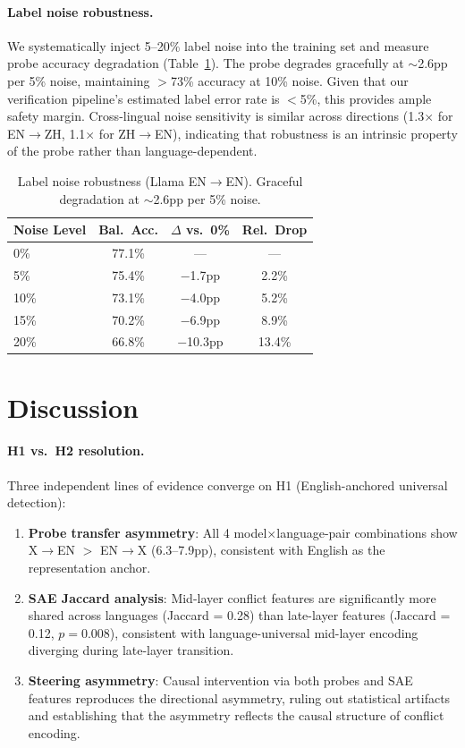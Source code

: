\documentclass{article}
\begin{document}
\paragraph{Label noise robustness.}
We systematically inject 5--20\% label noise into the training set and measure probe accuracy degradation (Table~\ref{tab:noise}). The probe degrades gracefully at $\sim$2.6pp per 5\% noise, maintaining $>$73\% accuracy at 10\% noise. Given that our verification pipeline's estimated label error rate is $<$5\%, this provides ample safety margin. Cross-lingual noise sensitivity is similar across directions (1.3$\times$ for EN$\to$ZH, 1.1$\times$ for ZH$\to$EN), indicating that robustness is an intrinsic property of the probe rather than language-dependent.

\begin{table}[t]
\centering
\caption{Label noise robustness (Llama EN$\to$EN). Graceful degradation at $\sim$2.6pp per 5\% noise.}
\label{tab:noise}
\small
\begin{tabular}{lccc}
\toprule
Noise Level & Bal.\ Acc. & $\Delta$ vs.\ 0\% & Rel.\ Drop \\
\midrule
0\% & 77.1\% & --- & --- \\
5\% & 75.4\% & $-$1.7pp & 2.2\% \\
10\% & 73.1\% & $-$4.0pp & 5.2\% \\
15\% & 70.2\% & $-$6.9pp & 8.9\% \\
20\% & 66.8\% & $-$10.3pp & 13.4\% \\
\bottomrule
\end{tabular}
\end{table}

\section{Discussion}

\paragraph{H1 vs.\ H2 resolution.}
Three independent lines of evidence converge on H1 (English-anchored universal detection):

\begin{enumerate}
    \item \textbf{Probe transfer asymmetry}: All 4 model$\times$language-pair combinations show X$\to$EN $>$ EN$\to$X (6.3--7.9pp), consistent with English as the representation anchor.
    \item \textbf{SAE Jaccard analysis}: Mid-layer conflict features are significantly more shared across languages (Jaccard = 0.28) than late-layer features (Jaccard = 0.12, $p = 0.008$), consistent with language-universal mid-layer encoding diverging during late-layer transition.
    \item \textbf{Steering asymmetry}: Causal intervention via both probes and SAE features reproduces the directional asymmetry, ruling out statistical artifacts and establishing that the asymmetry reflects the causal structure of conflict encoding.
\end{enumerate}
\end{document}
